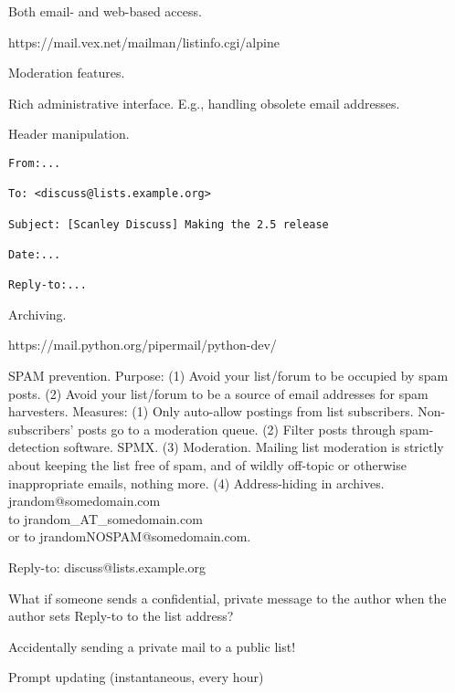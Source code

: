 \documentclass[landscape,30pt]{foils}
\begin{document}

Both email- and web-based access.

https://mail.vex.net/mailman/listinfo.cgi/alpine

Moderation features. 

Rich administrative interface.  E.g., handling obsolete email addresses.

Header manipulation.

{\tiny
\begin{verbatim}
From:...

To: <discuss@lists.example.org>

Subject: [Scanley Discuss] Making the 2.5 release

Date:...

Reply-to:...
\end{verbatim}
}


Archiving.

https://mail.python.org/pipermail/python-dev/
  
SPAM prevention.  Purpose: (1) Avoid your list/forum to be occupied by spam posts.  (2) Avoid your list/forum to be a source of email addresses for spam harvesters.  Measures: (1) Only auto-allow postings from list subscribers. Non-subscribers' posts go to a moderation queue.  (2)  Filter posts through spam-detection software. SPMX.  (3)  Moderation.  Mailing list moderation
is strictly about keeping the list free of spam, and of wildly off-topic or otherwise inappropriate emails, nothing more. (4) Address-hiding in archives. jrandom@somedomain.com \\to jrandom\_AT\_somedomain.com \\or to jrandomNOSPAM@somedomain.com.


Reply-to: discuss@lists.example.org

What if someone sends a confidential, private message to the author when the author sets Reply-to to the list address?

Accidentally sending a private mail to a public list!



Prompt updating (instantaneous, every hour)
\end{document}
